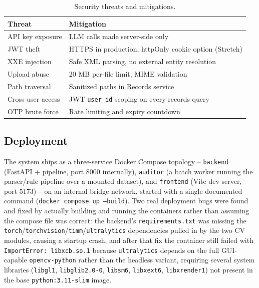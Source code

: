 \documentclass[10pt,conference]{IEEEtran}
\begin{document}
\begin{table}[!t]
\caption{Security threats and mitigations.}
\label{tab:security}
\centering
\scriptsize
\begin{tabular}{@{}p{2.3cm}p{5.3cm}@{}}
\toprule
\textbf{Threat} & \textbf{Mitigation} \\
\midrule
API key exposure & LLM calls made server-side only \\
JWT theft & HTTPS in production; httpOnly cookie option (Stretch) \\
XXE injection & Safe XML parsing, no external entity resolution \\
Upload abuse & 20 MB per-file limit, MIME validation \\
Path traversal & Sanitized paths in Records service \\
Cross-user access & JWT \texttt{user\_id} scoping on every records query \\
OTP brute force & Rate limiting and expiry countdown \\
\bottomrule
\end{tabular}
\end{table}

\subsection{Deployment}
The system ships as a three-service Docker Compose topology -- \texttt{backend} (FastAPI + pipeline, port 8000 internally), \texttt{auditor} (a batch worker running the parser/rule pipeline over a mounted dataset), and \texttt{frontend} (Vite dev server, port 5173) -- on an internal bridge network, started with a single documented command (\texttt{docker compose up --build}). Two real deployment bugs were found and fixed by actually building and running the containers rather than assuming the compose file was correct: the backend's \texttt{requirements.txt} was missing the \texttt{torch}/\texttt{torchvision}/\texttt{timm}/\texttt{ultralytics} dependencies pulled in by the two CV modules, causing a startup crash, and after that fix the container still failed with \texttt{ImportError: libxcb.so.1} because \texttt{ultralytics} depends on the full GUI-capable \texttt{opencv-python} rather than the headless variant, requiring several system libraries (\texttt{libgl1}, \texttt{libglib2.0-0}, \texttt{libsm6}, \texttt{libxext6}, \texttt{libxrender1}) not present in the base \texttt{python:3.11-slim} image.
\end{document}
